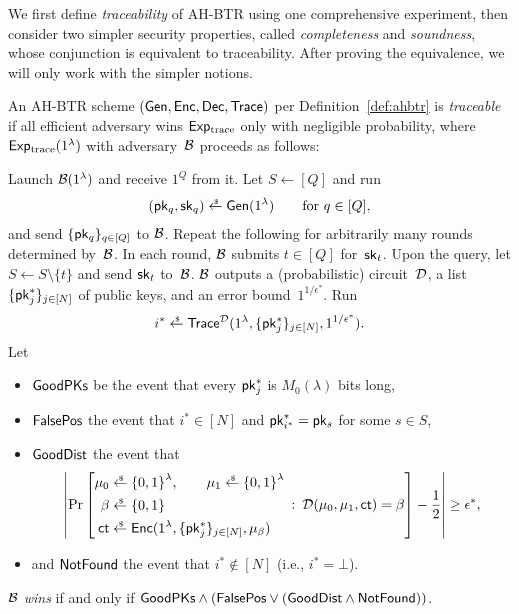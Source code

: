 We first define \emph{traceability} of AH-BTR using one comprehensive experiment,
then consider two simpler security properties, called \emph{completeness} and \emph{soundness}, whose conjunction is equivalent to traceability.
After proving the equivalence, we will only work with the simpler notions.

\begin{definition}[traceability]\label{def:tracing-security}
An AH-BTR scheme $(\Gen,\Enc,\Dec,\Trace)$ per Definition~\ref{def:ahbtr} is \emph{traceable}
if all efficient adversary wins $\ExpTrace$ only with negligible probability,
where $\ExpTrace(1^\lambda)$ with adversary~${\mathcal{B}}$ proceeds as follows:
\begin{security}
Launch ${\mathcal{B}}(1^\lambda)$ and receive $1^Q$ from it.
Let ${S\gets[Q]}$ and run
\begin{align*}
(\pk_q,\sk_q)\draws\Gen(1^\lambda)\qquad\textup{for }q\in[Q],
\end{align*}
and send $\{\pk_q\}_{q\in[Q]}$ to ${\mathcal{B}}$.
Repeat the following for arbitrarily many rounds determined by~${\mathcal{B}}$.
In each round, ${\mathcal{B}}$ submits ${t\in[Q]}$ for~$\sk_t$.
Upon the query, let ${S\gets S\setminus\{t\}}$ and send $\sk_t$ to~${\mathcal{B}}$.
${\mathcal{B}}$ outputs a (probabilistic) circuit~${\mathcal{D}}$,
a list $\{\pk^\ast_j\}_{j\in[N]}$ of public keys, and
an error bound~$1^{1/\epsilon^\ast}$.
Run
\begin{align*}
i^\ast\draws\Trace^\scriptD(1^\lambda,\{\pk^\ast_j\}_{j\in[N]},1^{1/\epsilon^\ast}).
\end{align*}
Let
\begin{itemize}
\item $\GoodPKs$ be the event that every $\pk^\ast_j$ is $M_0(\lambda)$ bits long,
\item $\FalsePos$ the event that ${i^\ast\in[N]}$ and ${\pk^\ast_{i^\ast}=\pk_s}$ for some ${s\in S}$,
\item $\GoodDist$ the event that
\begin{align*}
\left|\Pr\left[
\begin{aligned}
\mu_0&{}\draws\bit^\lambda,\qquad
\mu_1\draws\bit^\lambda\\
\beta&{}\draws\bit\\
\ct&{}\draws\Enc(1^\lambda,\{\pk^\ast_j\}_{j\in[N]},\mu_\beta)
\end{aligned}
\::\:
\scriptD(\mu_0,\mu_1,\ct)=\beta
\right]-\frac12
\right|
\geq\epsilon^\ast,
\end{align*}
\item and
$\NotFound$ the event that ${i^\ast\notin[N]}$ (i.e., ${i^\ast=\bot}$).
\end{itemize}
${\mathcal{B}}$ \emph{wins} if and only if ${\GoodPKs\wedge(\FalsePos\vee(\GoodDist\wedge\NotFound))}$.
\end{security}
\end{definition}

